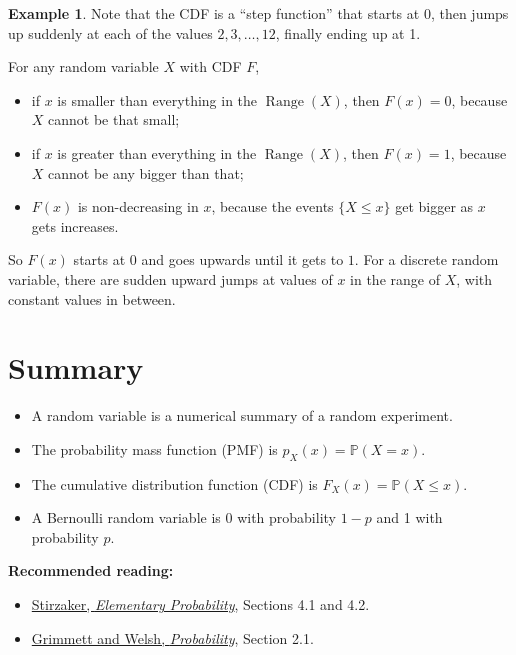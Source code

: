\documentclass[
  a4paper,
]{book}
\providecommand{\tightlist}{%
  \setlength{\itemsep}{0pt}\setlength{\parskip}{0pt}}
\theoremstyle{definition}
\theoremstyle{definition}
\newtheorem{example}{Example}[chapter]
\theoremstyle{definition}
\theoremstyle{definition}
\theoremstyle{remark}
\begin{document}
\begin{example}
Note that the CDF is a ``step function'' that starts at 0, then jumps up suddenly at each of the values \(2, 3, \dots, 12\), finally ending up at 1.
\end{example}

For any random variable \(X\) with CDF \(F\),

\begin{itemize}
\tightlist
\item
  if \(x\) is smaller than everything in the \(\operatorname{Range}(X)\), then \(F(x) = 0\), because \(X\) cannot be that small;
\item
  if \(x\) is greater than everything in the \(\operatorname{Range}(X)\), then \(F(x) = 1\), because \(X\) cannot be any bigger than that;
\item
  \(F(x)\) is non-decreasing in \(x\), because the events \(\{X \leq x\}\) get bigger as \(x\) gets increases.
\end{itemize}

So \(F(x)\) starts at \(0\) and goes upwards until it gets to \(1\). For a discrete random variable, there are sudden upward jumps at values of \(x\) in the range of \(X\), with constant values in between.

\hypertarget{summary-L09}{%
\section*{Summary}\label{summary-L09}}

\begin{itemize}
\tightlist
\item
  A random variable is a numerical summary of a random experiment.
\item
  The probability mass function (PMF) is \(p_X(x) = \mathbb P(X = x)\).
\item
  The cumulative distribution function (CDF) is \(F_X(x) = \mathbb P(X \leq x)\).
\item
  A Bernoulli random variable is 0 with probability \(1-p\) and 1 with probability \(p\).
\end{itemize}

\textbf{Recommended reading:}

\begin{itemize}
\tightlist
\item
  \href{https://leeds.primo.exlibrisgroup.com/permalink/44LEE_INST/13rlbcs/alma991013131349705181}{Stirzaker, \emph{Elementary Probability}}, Sections 4.1 and 4.2.
\item
  \href{https://leeds.primo.exlibrisgroup.com/permalink/44LEE_INST/13rlbcs/alma991002938669705181}{Grimmett and Welsh, \emph{Probability}}, Section 2.1.
\end{itemize}
\end{document}

